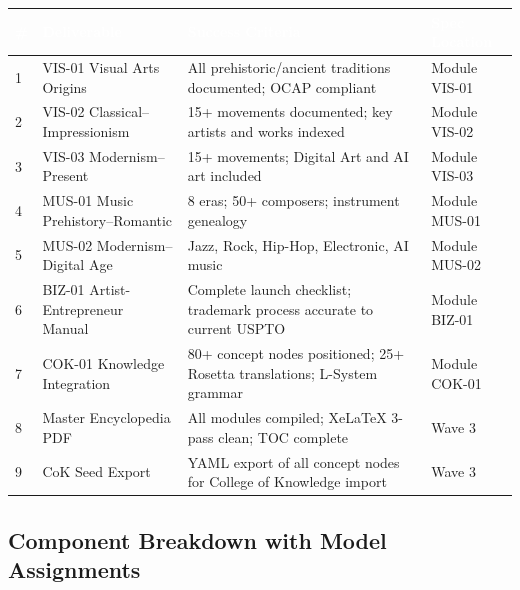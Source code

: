 \documentclass[11pt,letterpaper]{article}
\newcommand{\tableheader}[1]{\textbf{\sffamily\textcolor{white}{#1}}}
\begin{document}
\begin{tabularx}{\textwidth}{C{0.5cm}L{3.5cm}L{5cm}L{3.5cm}}
\toprule
{}
\tableheader{\#} & \tableheader{Deliverable} & \tableheader{Success Criteria} & \tableheader{Spec Location} \\
 & VIS-01 Visual Arts Origins & All prehistoric/ancient traditions documented; OCAP compliant & Module VIS-01 \\
2 & VIS-02 Classical--Impressionism & 15+ movements documented; key artists and works indexed & Module VIS-02 \\
3 & VIS-03 Modernism--Present & 15+ movements; Digital Art and AI art included & Module VIS-03 \\
4 & MUS-01 Music Prehistory--Romantic & 8 eras; 50+ composers; instrument genealogy & Module MUS-01 \\
5 & MUS-02 Modernism--Digital Age & Jazz, Rock, Hip-Hop, Electronic, AI music & Module MUS-02 \\
6 & BIZ-01 Artist-Entrepreneur Manual & Complete launch checklist; trademark process accurate to current USPTO & Module BIZ-01 \\
7 & COK-01 Knowledge Integration & 80+ concept nodes positioned; 25+ Rosetta translations; L-System grammar & Module COK-01 \\
8 & Master Encyclopedia PDF & All modules compiled; XeLaTeX 3-pass clean; TOC complete & Wave 3 \\
9 & CoK Seed Export & YAML export of all concept nodes for College of Knowledge import & Wave 3 \\
\bottomrule
\end{tabularx}

\subsection{Component Breakdown with Model Assignments}
\end{document}
